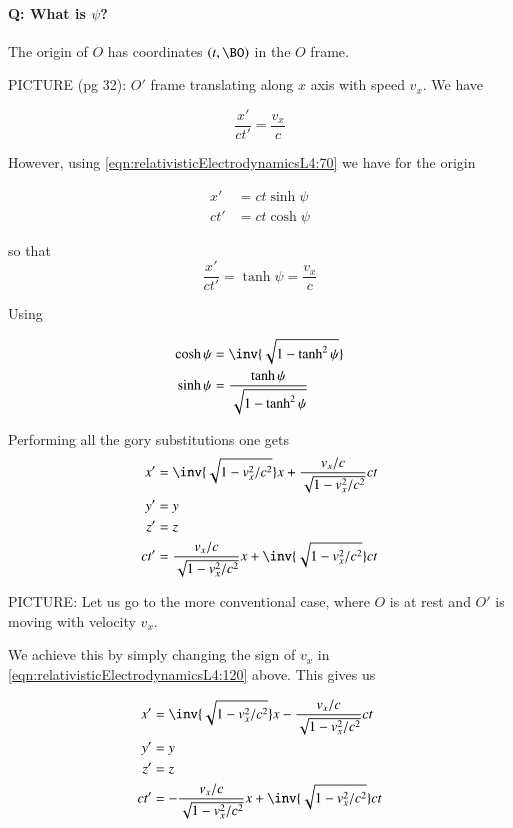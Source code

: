 \paragraph{Q: What is $\psi$?}

The origin of $O$ has coordinates $(t, \BO)$ in the $O$ frame.

PICTURE (pg 32): $O'$ frame translating along $x$ axis with speed $v_x$.  We have

\begin{equation}\label{eqn:relativisticElectrodynamicsL4:80}
\frac{x'}{c t'} = \frac{v_x}{c}
\end{equation}

However, using \ref{eqn:relativisticElectrodynamicsL4:70} we have for the origin

\begin{align}\label{eqn:relativisticElectrodynamicsL4:90}
x' &= ct \sinh \psi \\
ct' &= ct \cosh \psi
\end{align}

so that
\begin{equation}\label{eqn:relativisticElectrodynamicsL4:100}
\frac{x'}{c t'} = \tanh \psi = \frac{v_x}{c}
\end{equation}

Using 

\begin{align}\label{eqn:relativisticElectrodynamicsL4:110}
\cosh \psi &= \inv{\sqrt{1 - \tanh^2 \psi}} \\
\sinh \psi &= \frac{\tanh \psi}{\sqrt{1 - \tanh^2 \psi}}
\end{align}

Performing all the gory substitutions one gets
\begin{align}\label{eqn:relativisticElectrodynamicsL4:120}
x' &= 
\inv{\sqrt{1 - v_x^2/c^2}} x
+
\frac{v_x/c}{\sqrt{1 - v_x^2/c^2}} c t \\
y' &= y \\
z' &= z \\
ct' &= 
\frac{v_x/c}{\sqrt{1 - v_x^2/c^2}} x
+
\inv{\sqrt{1 - v_x^2/c^2}} c t
\end{align}

PICTURE: Let us go to the more conventional case, where $O$ is at rest and $O'$ is moving with velocity $v_x$.

We achieve this by simply changing the sign of $v_x$ in \ref{eqn:relativisticElectrodynamicsL4:120} above.  This gives us

\begin{align}\label{eqn:relativisticElectrodynamicsL4:120b}
x' &= 
\inv{\sqrt{1 - v_x^2/c^2}} x
-
\frac{v_x/c}{\sqrt{1 - v_x^2/c^2}} c t \\
y' &= y \\
z' &= z \\
ct' &= 
-\frac{v_x/c}{\sqrt{1 - v_x^2/c^2}} x
+
\inv{\sqrt{1 - v_x^2/c^2}} c t
\end{align}

